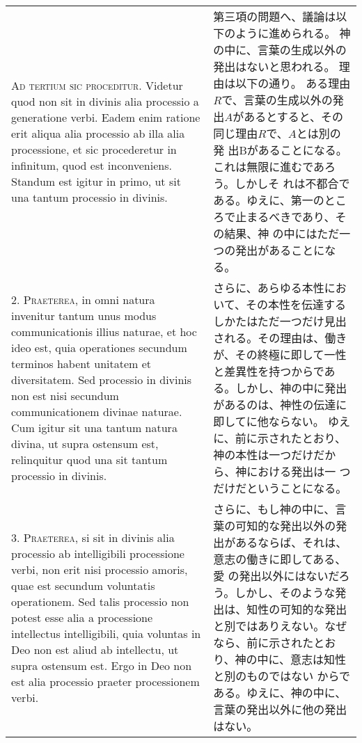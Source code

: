 \documentclass[10pt]{jsarticle} %
\begin{document}
\begin{longtable}{p{21em}p{21em}}



{\scshape Ad tertium sic proceditur}. Videtur quod non sit in divinis alia
processio a generatione verbi. Eadem enim ratione erit aliqua alia
processio ab illa alia processione, et sic procederetur in infinitum,
quod est inconveniens. Standum est igitur in primo, ut sit una tantum
processio in divinis.


&

第三項の問題へ、議論は以下のように進められる。
神の中に、言葉の生成以外の発出はないと思われる。
理由は以下の通り。
ある理由$R$で、言葉の生成以外の発出$A$があるとすると、その同じ理由$R$で、$A$とは別の発
 出Bがあることになる。これは無限に進むであろう。しかしそ
 れは不都合である。ゆえに、第一のところで止まるべきであり、その結果、神
 の中にはただ一つの発出があることになる。


\\



2. {\scshape Praeterea}, in omni natura invenitur tantum unus modus communicationis
illius naturae, et hoc ideo est, quia operationes secundum terminos
habent unitatem et diversitatem. Sed processio in divinis non est nisi
secundum communicationem divinae naturae. Cum igitur sit una tantum
natura divina, ut supra ostensum est, relinquitur quod una sit tantum
processio in divinis.


&

さらに、あらゆる本性において、その本性を伝達するしかたはただ一つだけ見出
 される。その理由は、働きが、その終極に即して一性と差異性を持つからであ
 る。しかし、神の中に発出があるのは、神性の伝達に即してに他ならない。
ゆえに、前に示されたとおり、神の本性は一つだけだから、神における発出は一
 つだけだということになる。

\\



3. {\scshape Praeterea}, si sit in divinis alia processio ab intelligibili processione
verbi, non erit nisi processio amoris, quae est secundum voluntatis
operationem. Sed talis processio non potest esse alia a processione
intellectus intelligibili, quia voluntas in Deo non est aliud ab
intellectu, ut supra ostensum est. Ergo in Deo non est alia processio
praeter processionem verbi.


&

さらに、もし神の中に、言葉の可知的な発出以外の発出があるならば、それは、意志の働きに即してある、愛
 の発出以外にはないだろう。しかし、そのような発出は、知性の可知的な発出
 と別ではありえない。なぜなら、前に示されたとおり、神の中に、意志は知性と別のものではない
 からである。ゆえに、神の中に、言葉の発出以外に他の発出はない。


\end{longtable}
\end{document}
